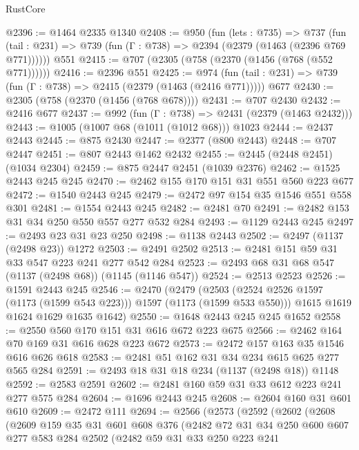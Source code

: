 \begin{lexlean}{RustCore}
\begin{coremodule}
@2396 := @1464 @2335 @1340
@2408 := @950
    (fun (lets : @735) =>
    @737 (fun (tail : @231) => @739 (fun (Γ : @738) => @2394 (@2379 (@1463 (@2396 @769 @771))))))
    @551
@2415 := @707 (@2305 (@758 (@2370 (@1456 (@768 (@552 @771))))))
@2416 := @2396 @551
@2425 := @974
    (fun (tail : @231) => @739 (fun (Γ : @738) => @2415 (@2379 (@1463 (@2416 @771)))))
    @677
@2430 := @2305 (@758 (@2370 (@1456 (@768 @678))))
@2431 := @707 @2430
@2432 := @2416 @677
@2437 := @992 (fun (Γ : @738) => @2431 (@2379 (@1463 @2432)))
@2443 := @1005 (@1007 @68 (@1011 (@1012 @68))) @1023
@2444 := @2437 @2443
@2445 := @875 @2430
@2447 := @2377 (@800 @2443)
@2448 := @707 @2447
@2451 := @807 @2443 @1462 @2432
@2455 := @2445 (@2448 @2451) (@1034 @2304)
@2459 := @875 @2447 @2451 (@1039 @2376)
@2462 := @1525 @2443 @245 @245
@2470 := @2462 @155 @170 @151 @31 @551 @560 @223 @677
@2472 := @1540 @2443 @245
@2479 := @2472 @97 @154 @35 @1546 @551 @558 @301
@2481 := @1554 @2443 @245
@2482 := @2481 @70
@2491 := @2482 @153 @31 @34 @250 @550 @557 @277 @532 @284
@2493 := @1129 @2443 @245
@2497 := @2493 @23 @31 @23 @250
@2498 := @1138 @2443
@2502 := @2497 (@1137 (@2498 @23)) @1272
@2503 := @2491 @2502
@2513 := @2481 @151 @59 @31 @33 @547 @223 @241 @277 @542 @284
@2523 := @2493 @68 @31 @68 @547 (@1137 (@2498 @68)) (@1145 (@1146 @547))
@2524 := @2513 @2523
@2526 := @1591 @2443 @245
@2546 := @2470
    (@2479
      (@2503 (@2524 @2526 @1597 (@1173 (@1599 @543 @223))) @1597 (@1173 (@1599 @533 @550)))
      @1615
      @1619
      @1624
      @1629
      @1635
      @1642)
@2550 := @1648 @2443 @245 @245 @1652
@2558 := @2550 @560 @170 @151 @31 @616 @672 @223 @675
@2566 := @2462 @164 @70 @169 @31 @616 @628 @223 @672
@2573 := @2472 @157 @163 @35 @1546 @616 @626 @618
@2583 := @2481 @51 @162 @31 @34 @234 @615 @625 @277 @565 @284
@2591 := @2493 @18 @31 @18 @234 (@1137 (@2498 @18)) @1148
@2592 := @2583 @2591
@2602 := @2481 @160 @59 @31 @33 @612 @223 @241 @277 @575 @284
@2604 := @1696 @2443 @245
@2608 := @2604 @160 @31 @601 @610
@2609 := @2472 @111
@2694 := @2566
    (@2573
      (@2592
        (@2602
          (@2608
            (@2609
              @159
              @35
              @31
              @601
              @608
              @376
              (@2482
                @72
                @31
                @34
                @250
                @600
                @607
                @277
                @583
                @284
                @2502
                (@2482
                  @59
                  @31
                  @33
                  @250
                  @223
                  @241

\end{coremodule}
\end{lexlean}
